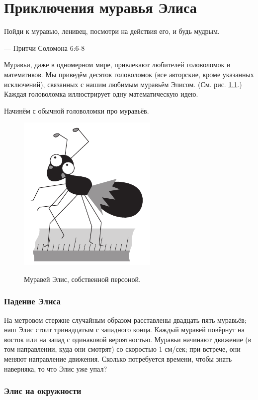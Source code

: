 \chapter{Приключения муравья Элиса}


\setlength{\epigraphwidth}{.67\textwidth}
\epigraph{Пойди к муравью, ленивец, посмотри на действия его, и будь мудрым.
}{--- Притчи Соломона 6:6-8} 

Муравьи, даже в одномерном мире, привлекают любителей головоломок и математиков.
Мы приведём десяток головоломок (все авторские, кроме указанных исключений), связанных с нашим любимым муравьём Элисом.
(См. рис. \ref{pic:alice1}.)
Каждая головоломка иллюстрирует одну математическую идею.

Начинём с обычной головоломки про муравьёв.

\begin{figure}[h!]
\centering
\includegraphics[scale=.5]{pics/alice1}
\label{pic:alice1}
\caption{Муравей Элис, собственной персоной.}
\end{figure}

\subsection*{Падение Элиса}

На метровом стержне случайным образом расставлены двадцать пять муравьёв; наш Элис стоит тринадцатым с западного конца.
Каждый муравей повёрнут на восток или на запад с одинаковой вероятностью.
Муравьи начинают движение (в том направлении, куда они смотрят) со скоростью 1 см/сек;
при встрече, они меняют направление движения.
Сколько потребуется времени, чтобы знать наверняка, то что Элис уже упал?

\subsection*{Элис на окружности}

